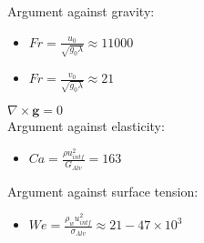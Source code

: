 Argument against gravity:\\%
\begin{itemize}
\item $Fr=\frac{u_0}{\sqrt{g_0 \lambda}}\approx11000$
\item $Fr=\frac{v_0}{\sqrt{g_0 \lambda}}\approx21$
\end{itemize}
$\nabla \times \boldsymbol{g}=0$\\

Argument against elasticity:\\
\begin{itemize}
\item $Ca=\frac{\rho u_{intf}^2}{G_{Alv}} = 163$
\end{itemize}

Argument against surface tension:\\
\begin{itemize}
\item $We=\frac{\rho_w u_{intf}^2}{\sigma_{Alv}} \approx 21-47 \times 10^3 $
\end{itemize}



